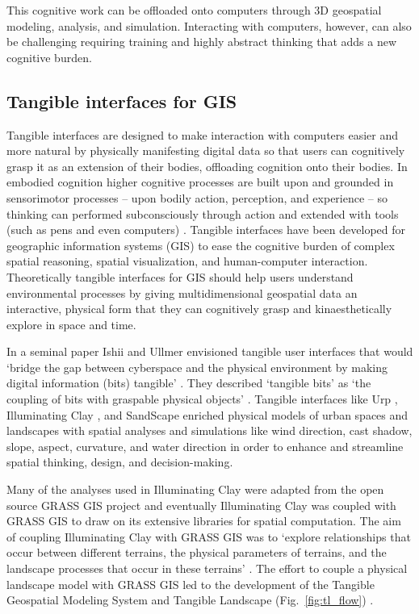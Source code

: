 \documentclass{isprs}
\begin{document}
This cognitive work can be offloaded onto computers through 3D geospatial modeling, analysis, and simulation. Interacting with computers, however, can also be challenging requiring training and highly abstract thinking that adds a new cognitive burden.

\subsection{Tangible interfaces for GIS}
%
Tangible interfaces are designed to make interaction with computers easier and more natural
by physically manifesting digital data so that users can cognitively grasp it as an extension of their bodies, offloading cognition onto their bodies. 
%
In embodied cognition higher cognitive processes are built upon and grounded in sensorimotor processes -- upon bodily action, perception, and experience -- 
so thinking can performed subconsciously through action and extended with tools 
(such as pens and even computers) \cite{Kirsh2013}.
%
Tangible interfaces have been developed for geographic information systems (GIS) to ease the cognitive burden of complex spatial reasoning, spatial visualization, and human-computer interaction. 
%
Theoretically tangible interfaces for GIS should help users understand environmental processes
by giving multidimensional geospatial data an interactive, physical form 
that they can cognitively grasp and kinaesthetically explore in space and time. 

In a seminal paper Ishii and Ullmer envisioned tangible user interfaces that would 
`bridge the gap between cyberspace and the physical environment by making digital information (bits) tangible' \cite{Ishii1997}.
They described `tangible bits' as `the coupling of bits with graspable physical objects' \cite{Ishii1997}. 
Tangible interfaces like 
Urp \cite{Underkoffler1999}, Illuminating Clay \cite{Piper2002}, and SandScape \cite{Ratti2004} 
enriched physical models of urban spaces and landscapes with spatial analyses and simulations 
like wind direction, cast shadow, slope, aspect, curvature, and water direction
in order to enhance and streamline spatial thinking, design, and decision-making.

Many of the analyses used in Illuminating Clay were adapted from the open source GRASS GIS project \cite{Piper2002a} 
and eventually 
Illuminating Clay was coupled with GRASS GIS 
to draw on its extensive libraries for spatial computation. 
The aim of coupling Illuminating Clay with GRASS GIS was to 
`explore relationships that occur between different terrains, the physical parameters of terrains, and the landscape processes that occur in these terrains' \cite{Mitasova2006}. 
%
The effort to couple a physical landscape model with GRASS GIS led to the development of 
the Tangible Geospatial Modeling System \cite{Tateosian2010} and Tangible Landscape (Fig.~\ref{fig:tl_flow}) \cite{Petrasova2014,Petrasova2015}.
\end{document}
